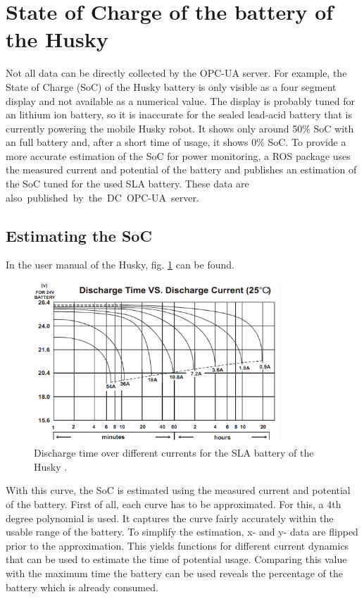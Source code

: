 \documentclass[conference]{IEEEtran}
\begin{document}
\section{State of Charge of the  battery of the Husky}
Not all data can be directly collected by the OPC-UA server.
For example, the State of Charge (SoC) of the Husky battery is only visible as a four segment display and not available as a numerical value.
The display is probably tuned for an lithium ion battery, so it is  inaccurate for the sealed lead-acid battery that is currently powering the mobile Husky robot. It shows only around 50\% SoC with an full battery and, after a short time of usage, it shows 0\% SoC.
To provide a more accurate estimation of the SoC for power monitoring, a ROS package uses the measured current and potential of the battery and publishes an estimation of the SoC tuned for the used SLA battery.
These data are \mbox{also published by the DC OPC-UA server.}
\subsection{Estimating the SoC}
In the user manual of the Husky, fig. \ref{fig:EndladekuvenSLA} can be found.
\begin{figure}[b]
    \centerline{\includegraphics[width=9.2cm]{Pictures/EndladekuvenSLA.png}}
    \caption{Discharge time over different currents for the SLA battery of the Husky \cite[p.21]{SLAKurven}.}
    \label{fig:EndladekuvenSLA}
\end{figure}
With this curve, the SoC is estimated using the measured current and potential of the battery.
First of all, each curve has to be approximated. For this, a 4th degree polynomial is used.
It captures the curve fairly accurately within the usable range of the battery.
To simplify the estimation,  x- and y- data are flipped prior to the approximation.
This yields functions for different current dynamics that can be used to estimate the time of potential usage.
Comparing this value with the maximum time the battery can be used reveals the percentage of the battery which is already consumed.
\end{document}
